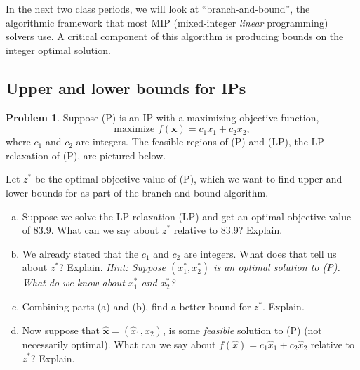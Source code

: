 \documentclass[11pt]{article}
\theoremstyle{definition}
\newtheorem{problem}{Problem}
\newcommand{\answerbox}[3]{%
  \fbox{%
    \begin{minipage}[#1]{#2}
      \hfill\vspace{#3}
    \end{minipage}
  }
}
\newcommand{\answerboxone}[2]{%
  \answerbox{#1}{6.0in}{#2} 
}
\begin{document}
In the next two class periods, we will look at ``branch-and-bound'', the algorithmic framework that most MIP (mixed-integer \emph{linear} programming) solvers use.  A critical component of this algorithm is producing bounds on the integer optimal solution.  

\subsection{Upper and lower bounds for IPs}
	
\begin{problem}
Suppose (P) is an IP with a maximizing objective function,
\[  \text{maximize } f(\mathbf{x}) = c_1 x_1 + c_2 x_2,  \]
where $c_1$ and $c_2$ are integers.  The feasible regions of (P) and (LP), the LP relaxation of (P), are pictured below.



\vspace{0.5cm}
\begin{center}
\begin{minipage}{6.5in}
\centering
\raisebox{-0.5\height}{\texttt{[image: P]}}
\hspace*{0.2in}
\raisebox{-0.5\height}{\texttt{[image: LP]}}
\end{minipage}
\end{center}


Let  $z^*$ be the optimal objective value of (P), which we want to find upper and lower bounds for as part of the branch and bound algorithm.

\begin{enumerate}[(a)]
\item    Suppose we solve the LP relaxation (LP) and get an optimal objective value of 83.9.  What can we say about $z^*$ relative to 83.9?  Explain.

\answerboxone{c}{1in}

\item We already stated that the $c_1$ and $c_2$ are integers.  What does that tell us about $z^*$?  Explain.  \emph{Hint:  Suppose $(x^*_1, x^*_2)$ is an optimal solution to (P).  What do we know about $x^*_1$ and  $x^*_2$?}

\answerboxone{c}{1in}

\item  Combining parts (a) and (b), find a better bound for $z^*$.  Explain.

\answerboxone{c}{1in}

\item  Now suppose that $\hat{\mathbf{x}} = (\hat{x}_1, \hat{x}_2)$, is some \emph{feasible} solution to (P) (not necessarily optimal).  What can we say about $f(\hat{x}) =  c_1 \hat{x}_1 + c_2 \hat{x}_2$ relative to $z^*$?  Explain.

\answerboxone{c}{1in}
\end{enumerate}
\end{problem}
\end{document}
